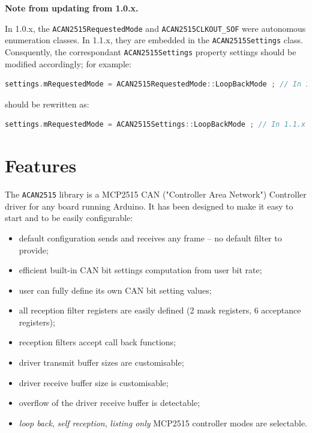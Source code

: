 \documentclass[10pt, a4paper, obeyspaces]{extarticle}
\begin{document}
{\bf Note from updating from 1.0.x.}

In 1.0.x, the \texttt{ACAN2515RequestedMode} and \texttt{ACAN2515CLKOUT\_SOF} were autonomous enumeration classes. In 1.1.x, they are embedded in the \texttt{ACAN2515Settings} class. Consquently, the correspondant \texttt{ACAN2515Settings} property settings should be modified accordingly; for example:

{ \small\begin{lstlisting}[language=c++]
  settings.mRequestedMode = ACAN2515RequestedMode::LoopBackMode ; // In 1.0.x
\end{lstlisting}}

should be rewritten as:
{ \small\begin{lstlisting}[language=c++]
  settings.mRequestedMode = ACAN2515Settings::LoopBackMode ; // In 1.1.x
\end{lstlisting}}



\section{Features}

The \texttt{ACAN2515} library is a MCP2515 CAN ("Controller Area Network") Controller driver for any board running Arduino. It has been designed to make it easy to start and to be easily configurable:
\begin{itemize}
  \item default configuration sends and receives any frame -- no default filter to provide;
  \item efficient built-in CAN bit settings computation from user bit rate;
  \item user can fully define its own CAN bit setting values;
  \item all reception filter registers are easily defined (2 mask registers, 6 acceptance registers);
  \item reception filters accept call back functions;
  \item driver transmit buffer sizes are customisable;
  \item driver receive buffer size is customisable;
  \item overflow of the driver receive buffer is detectable;
  \item \emph{loop back}, \emph{self reception}, \emph{listing only} MCP2515 controller modes are selectable.
\end{itemize}
\end{document}
